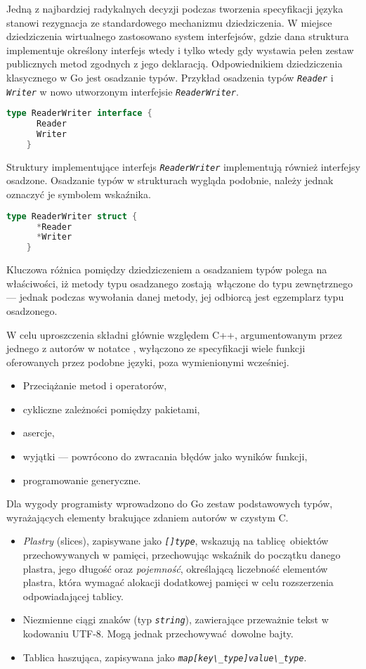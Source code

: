   \par{
  Jedną z najbardziej radykalnych decyzji podczas tworzenia specyfikacji języka stanowi rezygnacja ze standardowego mechanizmu dziedziczenia. W miejsce dziedziczenia wirtualnego zastosowano system interfejsów, gdzie dana struktura implementuje określony interfejs wtedy i tylko wtedy gdy wystawia pełen zestaw publicznych metod zgodnych z jego deklaracją. Odpowiednikiem dziedziczenia klasycznego w Go jest osadzanie typów.
  Przykład osadzenia typów \textit{\lstinline{Reader}} i \textit{\lstinline{Writer}} w nowo utworzonym interfejsie \textit{\lstinline{ReaderWriter}}.
  \begin{lstlisting}[language=go]
    type ReaderWriter interface {
      Reader
      Writer
    }
  \end{lstlisting}
  Struktury implementujące interfejs \textit{\lstinline{ReaderWriter}} implementują również interfejsy osadzone.
  Osadzanie typów w strukturach wygląda podobnie, należy jednak oznaczyć je symbolem wskaźnika.
  \begin{lstlisting}[language=go]
    type ReaderWriter struct {
      *Reader
      *Writer
    }
  \end{lstlisting}
  Kluczowa różnica pomiędzy dziedziczeniem a osadzaniem typów polega na właściwości, iż metody typu osadzanego zostają włączone do typu zewnętrznego --- jednak podczas wywołania danej metody, jej odbiorcą jest egzemplarz typu osadzonego. \cite{godoc:embedding}
}
\par {
W celu uproszczenia składni głównie względem C++, argumentowanym przez jednego z autorów w notatce \cite{Pike:LessIsMore}, wyłączono ze specyfikacji wiele funkcji oferowanych przez podobne języki, poza wymienionymi wcześniej.
  \begin{itemize}
    \item Przeciążanie metod i operatorów,
    \item cykliczne zależności pomiędzy pakietami,
    \item asercje,
    \item wyjątki --- powrócono do zwracania błędów jako wyników funkcji,
    \item programowanie generyczne.
  \end{itemize}
}
\par{
  Dla wygody programisty wprowadzono do Go zestaw podstawowych typów, wyrażających elementy brakujące zdaniem autorów w czystym C.
  \begin{itemize}
    \item \emph{Plastry} (slices), zapisywane jako \textit{\lstinline{[]type}}, wskazują na tablicę obiektów przechowywanych w pamięci, przechowując wskaźnik do początku danego plastra, jego długość oraz \emph{pojemność}, określającą liczebność elementów plastra, która wymagać alokacji dodatkowej pamięci w celu rozszerzenia odpowiadającej tablicy.
    \item Niezmienne ciągi znaków (typ \textit{\lstinline{string}}), zawierające przeważnie tekst w kodowaniu UTF-8. Mogą jednak przechowywać dowolne bajty.
    \item Tablica haszująca, zapisywana jako \textit{\lstinline{map[key\_type]value\_type}}.
  \end{itemize}
}
